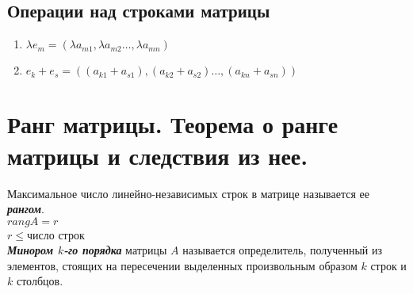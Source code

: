 \documentclass[12pt, fleqn]{article}
\begin{document}
\subsection*{Операции над строками матрицы}
\begin{enumerate}
	\item $\lambda e_m = \left(\lambda a_{m1}, \lambda a_{m2} \dots, \lambda a_{mn}\right)$
	\item $e_k+e_s=\left(\left(a_{k1}+a_{s1} \right),\left(a_{k2}+a_{s2} \right) \dots, \left(a_{kn}+a_{sn} \right)\right)$
\end{enumerate}
\section{Ранг матрицы. Теорема о ранге матрицы и следствия из нее.}
Максимальное число линейно-независимых строк в матрице называется ее \textbf{\textit{рангом}}.\\ $rang A = r$ \\$r \leq $число строк\\
\textbf{\textit{Минором $k$-го порядка}} матрицы $A$ называется определитель, полученный из элементов, стоящих на пересечении выделенных произвольным образом $k$ строк и $k$ столбцов.
\end{document}
